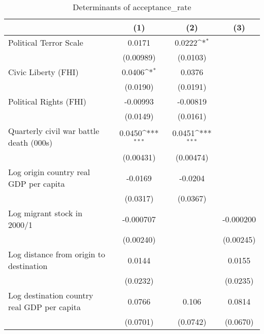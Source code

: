 \begin{table}[htbp]\centering
\def\sym#1{\ifmmode^{#1}\else\(^{#1}\)\fi}
\caption{Determinants of acceptance\_rate}
\begin{tabular}{l*{3}{c}}
\hline\hline
                    &\multicolumn{1}{c}{(1)}         &\multicolumn{1}{c}{(2)}         &\multicolumn{1}{c}{(3)}         \\
\hline
Political Terror Scale&      0.0171         &      0.0222\sym{*}  &                     \\
                    &   (0.00989)         &    (0.0103)         &                     \\
[1em]
Civic Liberty (FHI) &      0.0406\sym{*}  &      0.0376         &                     \\
                    &    (0.0190)         &    (0.0191)         &                     \\
[1em]
Political Rights (FHI)&    -0.00993         &    -0.00819         &                     \\
                    &    (0.0149)         &    (0.0161)         &                     \\
[1em]
Quarterly civil war battle death (000s)&      0.0450\sym{***}&      0.0451\sym{***}&                     \\
                    &   (0.00431)         &   (0.00474)         &                     \\
[1em]
Log origin country real GDP per capita&     -0.0169         &     -0.0204         &                     \\
                    &    (0.0317)         &    (0.0367)         &                     \\
[1em]
Log migrant stock in 2000/1&   -0.000707         &                     &   -0.000200         \\
                    &   (0.00240)         &                     &   (0.00245)         \\
[1em]
Log distance from origin to destination&      0.0144         &                     &      0.0155         \\
                    &    (0.0232)         &                     &    (0.0235)         \\
[1em]
Log destination country real GDP per capita&      0.0766         &       0.106         &      0.0814         \\
                    &    (0.0701)         &    (0.0742)         &    (0.0670)         \\

\end{tabular}
\end{table}
